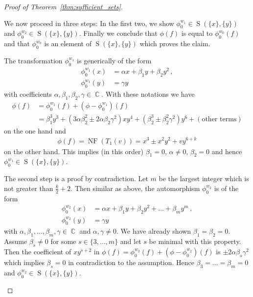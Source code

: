 \documentclass{amsproc}
\theoremstyle{definition}
\DeclareMathOperator{\C}{\mathbb{C}}
\DeclareMathOperator{\NF}{NF}
\DeclareMathOperator{\s}{S}
\begin{document}
\begin{proof}[Proof of Theorem~\ref{thm:sufficient_sets}]
\begin{description}[font=\normalfont\itshape,%
leftmargin=0cm,labelindent=\parindent]
We now proceed in three steps: In the first two, we show
$\phi_0^{w_1} \in \s(\{x\}, \{y\})$ and $\phi_0^{w_2} \in \s(\{x\}, \{y\})$.
Finally we conclude that $\phi(f)$ is equal to $\phi_0^{w_0}(f)$ and that
$\phi_0^{w_0}$ is an element of $\s(\{x\}, \{y\})$ which proves the claim.

The transformation $\phi_0^{w_1}$ is generically of the form
\begin{align*}
\phi_0^{w_1}(x) &= \alpha x + \beta_1 y + \beta_2 y^2 \,, \\
\phi_0^{w_1}(y) &= \gamma y
\end{align*}
with coefficients $\alpha, \beta_1, \beta_2, \gamma \in \C$. With these
notations we have
\begin{align*}
\phi(f)
&= \phi_0^{w_1}(f) + (\phi-\phi_0^{w_1})(f) \\
&= \beta_1^3 y^3 + (3\alpha\beta_2^2 \pm 2\alpha\beta_2\gamma^2) xy^4
+ (\beta_2^3 \pm \beta_2^2\gamma^2) y^6 + (\text{other terms})
\end{align*}
on the one hand and
\begin{align*}
\phi(f)
= \NF(T_1(v))
= x^3 \pm x^2 y^2 + vy^{6+k}
\end{align*}
on the other hand. This implies (in this order) $\beta_1 = 0$, $\alpha \neq 0$,
$\beta_2 = 0$ and hence $\phi_0^{w_1} \in \s(\{x\}, \{y\})$.

The second step is a proof by contradiction. Let $m$ be the largest integer
which is not greater than $\frac{k}{2}+2$. Then similar as above, the
automorphism $\phi_0^{w_2}$ is of the form
\begin{align*}
\phi_0^{w_2}(x)
&= \alpha x + \beta_1 y + \beta_2 y^2 + \ldots + \beta_m y^m \,, \\
\phi_0^{w_2}(y) &= \gamma y
\end{align*}
with $\alpha, \beta_1, \ldots, \beta_m, \gamma \in \C$ and
$\alpha, \gamma \neq 0$. We have already shown $\beta_1 = \beta_2 = 0$. Assume
$\beta_s \neq 0$ for some $s \in \{3, \ldots, m\}$ and let $s$ be minimal with
this property. Then the coefficient of $xy^{s+2}$ in
$\phi(f) = \phi_0^{w_2}(f) + (\phi-\phi_0^{w_2})(f)$ is
$\pm 2\alpha\beta_s\gamma^2$ which implies $\beta_s = 0$ in contradiction to
the assumption. Hence $\beta_3 = \ldots = \beta_m = 0$ and
$\phi_0^{w_2} \in \s(\{x\}, \{y\})$.


\end{description}
\end{proof}
\end{document}
